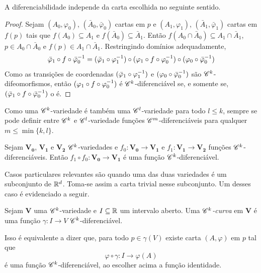A diferenciabilidade independe da carta escolhida no seguinte sentido.
\begin{proof}
Sejam $(A_0,\varphi_0)$, $(\bar A_0,\bar\varphi_0)$ cartas em $p$ e $(A_1,\varphi_1)$, $(\bar A_1,\bar\varphi_1)$ cartas em $f(p)$ tais que $f(A_0) \subseteq A_1$ e $f(\bar A_0) \subseteq \bar A_1$. Então $f(A_0 \cap \bar A_0) \subseteq A_1 \cap \bar A_1$, $p \in A_0 \cap \bar A_0$ e $f(p) \in A_1 \cap \bar A_1$. Restringindo domínios adequadamente,
	\begin{equation*}
	\bar \varphi_1 \circ f \circ \bar \varphi_0^{-1} = (\bar \varphi_1 \circ \varphi_1^{-1}) \circ (\varphi_1 \circ f \circ \varphi_0 ^{-1}) \circ (\varphi_0 \circ \bar \varphi_0^{-1})
	\end{equation*}
Como as transições de coordenadas $(\bar \varphi_1 \circ \varphi_1^{-1})$ e $(\varphi_0 \circ \bar \varphi_0^{-1})$ são $\mathscr{C}^k$-difeomorfismos, então $(\varphi_1 \circ f \circ \varphi_0 ^{-1})$ é $\mathscr{C}^k$-diferenciável se, e somente se, $(\bar \varphi_1 \circ f \circ \bar \varphi_0^{-1})$ o é.
\end{proof}

Como uma $\mathscr{C}^k$-variedade é também uma $\mathscr{C}^l$-variedade para todo $l\leq k$, sempre se pode definir entre $\mathscr{C}^k$ e $\mathscr{C}^l$-variedade funções $\mathscr{C}^m$-diferenciáveis para qualquer $m \leq \min\{k,l\}$.

\begin{prop}
Sejam $\bm{V_0}$, $\bm{V_1}$ e $\bm{V_2}$ $\mathscr{C}^k$-variedades e $f_0: \bm{V_0} \to \bm{V_1}$ e $f_1: \bm{V_1} \to \bm{V_2}$ funções $\mathscr{C}^k$-diferenciáveis. Então $f_1 \circ f_0: \bm{V_0} \to \bm{V_1}$ é uma função $\mathscr{C}^k$-diferenciável.
\end{prop}

Casos particulares relevantes são quando uma das duas variedades é um subconjunto de $\mathbb{R}^d$. Toma-se assim a carta trivial nesse subconjunto. Um desses caso é evidenciado a seguir.

\begin{defi}
Sejam $\bm V$ uma $\mathscr{C}^k$-variedade e $I \subseteq \mathbb{R}$ um intervalo aberto. Uma \emph{$\mathscr{C}^k$-curva} em $\bm V$ é uma função $\gamma: I \to V$ $\mathscr{C}^k$-diferenciável.
\end{defi}

Isso é equivalente a dizer que, para todo $p \in \gamma(V)$ existe carta $(A,\varphi)$ em $p$ tal que
	\begin{equation*}
	\varphi \circ \gamma: I \to \varphi(A)
	\end{equation*}
é uma função $\mathscr{C}^k$-diferenciável, ao escolher acima a função identidade.

